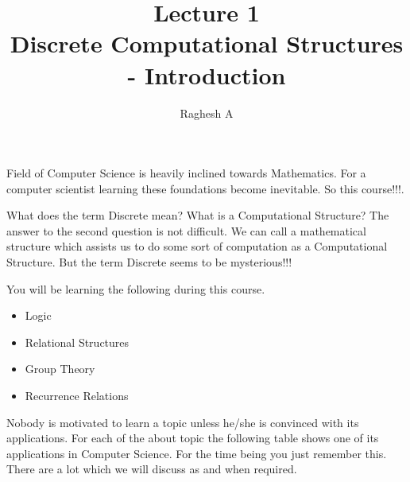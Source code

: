 \documentclass[a4paper,12pt]{article}
\title{Lecture 1\\Discrete Computational Structures - Introduction}
\date{}
\author{Raghesh A}
\begin{document}
\maketitle
Field of Computer Science is heavily inclined towards Mathematics. For a
computer scientist learning these foundations become inevitable.
So this course!!!.

What does the term Discrete mean? What is a Computational Structure? The
answer to the second question is not difficult. We can call a mathematical
structure which assists us to do some sort of computation as a Computational
Structure. But the term Discrete seems to be mysterious!!!

You will be learning the following during this course.

\begin{itemize}
\item Logic
\item Relational Structures
\item Group Theory
\item Recurrence Relations
\end{itemize}

Nobody is motivated to learn a topic unless he/she is convinced with
its applications. For each of the about topic the following table shows one
of its applications in Computer Science. For the time being you just remember
this. There are a lot which we will discuss as and when required.
\end{document}
